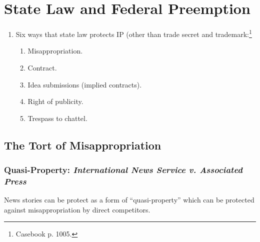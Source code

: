 \section{State Law and Federal Preemption}

\begin{enumerate}
    \item Six ways that state law protects IP (other than trade secret and 
    trademark:\footnote{Casebook p. 1005.}
    \begin{enumerate}
        \item Misappropriation.
        \item Contract.
        \item Idea submissions (implied contracts).
        \item Right of publicity.
        \item Trespass to chattel.
    \end{enumerate}
\end{enumerate}

\subsection{The Tort of Misappropriation}

\subsubsection{Quasi-Property: \emph{International News Service v. Associated 
Press}}

News stories can be protect as a form of ``quasi-property'' which can be 
protected against misappropriation by direct competitors.

